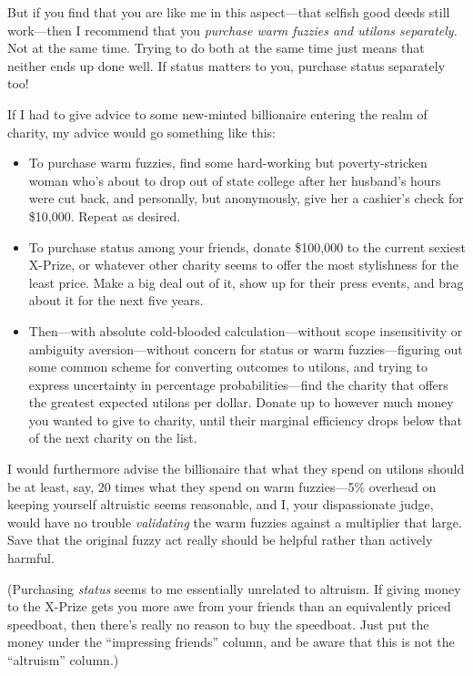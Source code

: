 {
 But if you find that you are like me in this aspect---that selfish
good deeds still work---then I recommend that you \textit{purchase warm
fuzzies and utilons separately.} Not at the same time. Trying to do
both at the same time just means that neither ends up done well. If
status matters to you, purchase status separately too!}

{
 If I had to give advice to some new-minted billionaire entering
the realm of charity, my advice would go something like this:}

\begin{itemize}
\item {
 To purchase warm fuzzies, find some hard-working but
poverty-stricken woman who's about to drop out of state
college after her husband's hours were cut back, and
personally, but anonymously, give her a cashier's check
for \$10,000. Repeat as desired.}

\item {
 To purchase status among your friends, donate \$100,000 to the
current sexiest X-Prize, or whatever other charity seems to offer the
most stylishness for the least price. Make a big deal out of it, show
up for their press events, and brag about it for the next five years.}

\item {
 Then---with absolute cold-blooded calculation---without scope
insensitivity or ambiguity aversion{}---without concern for status or
warm fuzzies---figuring out some common scheme for converting outcomes
to utilons, and trying to express uncertainty in percentage
probabilities---find the charity that offers the greatest expected
utilons per dollar. Donate up to however much money you wanted to give
to charity, until their marginal efficiency drops below that of the
next charity on the list.}
\end{itemize}

{
 I would furthermore advise the billionaire that what they spend on
utilons should be at least, say, 20 times what they spend on warm
fuzzies---5\% overhead on keeping yourself altruistic seems reasonable,
and I, your dispassionate judge, would have no trouble
\textit{validating} the warm fuzzies against a multiplier that large.
Save that the original fuzzy act really should be helpful rather than
actively harmful.}

{
 (Purchasing \textit{status} seems to me essentially unrelated to
altruism. If giving money to the X-Prize gets you more awe from your
friends than an equivalently priced speedboat, then
there's really no reason to buy the speedboat. Just put
the money under the ``impressing
friends'' column, and be aware that this is not the
``altruism'' column.)}

